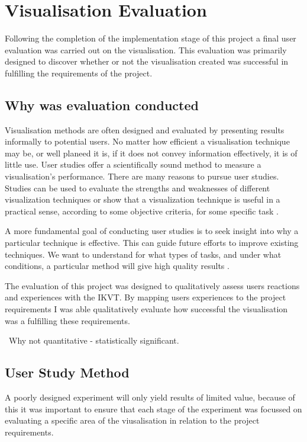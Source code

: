\chapter{Visualisation Evaluation}\label{C:sd}
Following the completion of the implementation stage of this project a final
user evaluation was carried out on the visualisation. This evaluation was
primarily designed to discover whether or not the visualisation created was
successful in fulfilling the requirements of the project.

\section{Why was evaluation conducted}
Visualisation methods are often designed and evaluated by presenting 
results informally to potential users. No matter how 
efficient a visualisation technique may be, or well planeed it is, if it does
not convey information 
effectively, it is of little use. User studies offer a 
scientifically sound method to measure a visualisation’s 
performance. There are many reasons to pursue user studies. Studies can 
be used to evaluate the strengths and weaknesses of 
different visualization techniques or show that a visualization technique is 
useful in a practical sense, according to some objective 
criteria, for some specific task \cite{kosara2003thoughts}. 

A more fundamental goal of conducting user studies is to 
seek insight into why a particular technique is effective. 
This can guide future efforts to improve existing 
techniques. We want to understand for what types of tasks, 
and under what conditions, a particular method will give 
high quality results \cite{kosara2003thoughts}.

The evaluation of this project was designed to qualitatively assess users
reactions and experiences with the IKVT. By mapping users experiences to the
project
requirements I was able qualitatively evaluate how successful the visualisation
was a fulfilling these requirements.

~Why not quantitative
 - statistically significant. 
\section{User Study Method}
A poorly designed experiment will only yield results of limited value, because
of this it was important to ensure that each stage of the experiment was
focussed on evaluating a specific area of the viusalisation in relation to the
project requirements.

